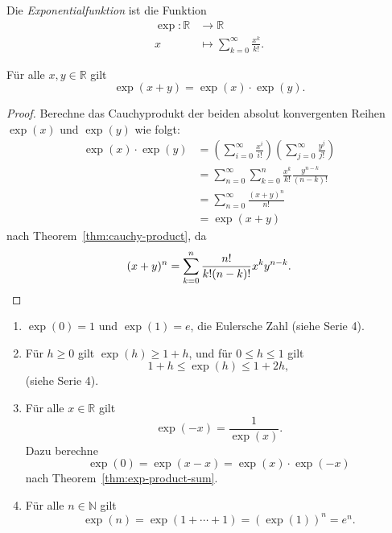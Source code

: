 \documentclass[../main.tex]{subfiles}
\begin{document}
\begin{definition}
  Die \emph{Exponentialfunktion} ist die Funktion
  \begin{align*}
    \exp \colon \mathbb{R} & \to \mathbb{R} \\
    x & \mapsto \sum_{k=0}^{\infty} \frac{x^k}{k!}.
  \end{align*}
\end{definition}

\begin{theorem}\label{thm:exp-product-sum}
  Für alle $x, y \in \mathbb{R}$ gilt
  \[
    \exp(x + y) = \exp (x) \cdot \exp (y).
  \]
\end{theorem}

\begin{proof}
  Berechne das Cauchyprodukt
  der beiden absolut konvergenten Reihen
  $\exp(x)$ und $\exp(y)$ wie folgt:
  \begin{align*}
    \exp(x) \cdot \exp(y) & =
    \left(\sum_{i=0}^{\infty} \frac{x^i}{i!}\right)
    \left( \sum_{j=0}^{\infty} \frac{y^j}{j!} \right)\\ &
    = \sum_{n=0}^{\infty} \sum_{k=0}^{n} \frac{x^k}{k!} 
    \frac{y^{n-k}}{(n-k)!} \\ &
    = \sum_{n=0}^{\infty} \frac{(x + y)^n}{n!} \\&
    = \exp(x + y)
  \end{align*}
  nach Theorem~\ref{thm:cauchy-product},
  da
  \[
    (x + y)^n = \sum_{k=0}^{n} \frac{n!}{k!(n-k)!} x^k y^{n-k}.
    \qedhere
  \]
\end{proof}

\begin{eig-exp}
  \leavevmode
  \begin{enumerate}[\normalfont(i)]
    \item $\exp(0) = 1$ und $\exp(1) = e$, die Eulersche Zahl
      (siehe Serie 4).
    \item Für $h \geq 0$ gilt $\exp(h) \geq 1 + h$,
      und für $0 \leq h \leq 1$ gilt  
      \[
        1 + h \leq \exp(h) \leq 1 + 2h,
      \]
      (siehe Serie 4). %
    \item Für alle $x \in \mathbb{R}$ gilt
      \[
        \exp(-x) = \frac{1}{\exp(x)}.
      \]
      Dazu berechne
      \[
        \exp(0) = \exp(x - x) = \exp(x) \cdot \exp(-x)
      \]
      nach Theorem~\ref{thm:exp-product-sum}.
    \item Für alle
      $n \in \mathbb{N}$ gilt
      \[
        \exp(n) = \exp(1 + \cdots + 1) =
        \left( \exp(1) \right)^n = e^n.
      \]
  \end{enumerate}
\end{eig-exp}
\end{document}
